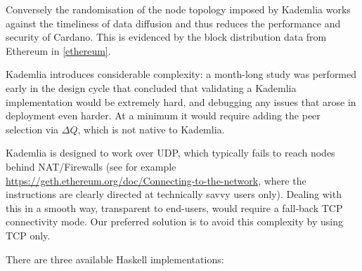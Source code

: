 \documentclass[11pt,a4paper]{article}
\begin{document}
Conversely the randomisation of the node topology imposed by Kademlia
works against the timeliness of data diffusion and thus reduces the
performance and security of Cardano. This is evidenced by the block
distribution data from Ethereum in \cref{ethereum}.

Kademlia introduces considerable complexity: a month-long study was
performed early in the design cycle that concluded that validating a
Kademlia implementation would be extremely hard, and debugging any
issues that arose in deployment even harder. At a minimum it would
require adding the peer selection via $\Delta{}Q$, which is not native to
Kademlia.

Kademlia is designed to work over UDP, which typically fails to reach
nodes behind NAT/Firewalls (see for example
\href{https://geth.ethereum.org/doc/Connecting-to-the-network}{{https://geth.ethereum.org/doc/Connecting-to-the-network}},
where the instructions are clearly directed at technically savvy users
only). Dealing with this in a smooth way, transparent to end-users,
would require a fall-back TCP connectivity mode. Our preferred solution
is to avoid this complexity by using TCP only.

There are three available Haskell implementations:
\end{document}
